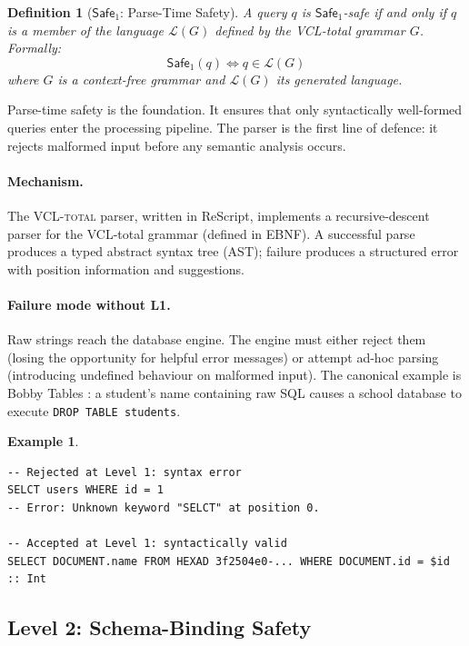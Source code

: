 \documentclass[11pt,a4paper]{article}
\newtheorem{definition}[theorem]{Definition}
\newtheorem{example}[theorem]{Example}
\newcommand{\VCL}{\textsc{VCL-total}}
\newcommand{\LevelN}[1]{\textsf{L#1}}
\newcommand{\Safe}[1]{\ensuremath{\mathsf{Safe}_{#1}}}
\begin{document}
\begin{definition}[\Safe{1}: Parse-Time Safety]
A query $q$ is \Safe{1}-safe if and only if $q$ is a member of the
language $\mathcal{L}(G)$ defined by the VCL-total grammar $G$.
Formally:
\[
  \Safe{1}(q) \iff q \in \mathcal{L}(G)
\]
where $G$ is a context-free grammar and $\mathcal{L}(G)$ its generated
language.
\end{definition}

Parse-time safety is the foundation.  It ensures that only
syntactically well-formed queries enter the processing pipeline.
The parser is the first line of defence: it rejects malformed input
before any semantic analysis occurs.

\paragraph{Mechanism.}
The \VCL{} parser, written in ReScript, implements a recursive-descent
parser for the VCL-total grammar (defined in EBNF).  A successful parse
produces a typed abstract syntax tree (AST); failure produces a
structured error with position information and suggestions.

\paragraph{Failure mode without \LevelN{1}.}
Raw strings reach the database engine.  The engine must either reject
them (losing the opportunity for helpful error messages) or attempt
ad-hoc parsing (introducing undefined behaviour on malformed input).
The canonical example is Bobby Tables \citep{xkcd327}: a student's
name containing raw SQL causes a school database to execute
\texttt{DROP TABLE students}.

\begin{example}
\begin{lstlisting}[language=VCL]
-- Rejected at Level 1: syntax error
SELCT users WHERE id = 1
-- Error: Unknown keyword "SELCT" at position 0.

-- Accepted at Level 1: syntactically valid
SELECT DOCUMENT.name FROM HEXAD 3f2504e0-... WHERE DOCUMENT.id = $id :: Int
\end{lstlisting}
\end{example}

\subsection{Level 2: Schema-Binding Safety}\label{sec:L2}
\end{document}
